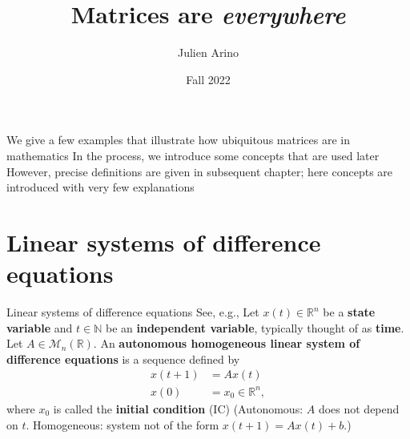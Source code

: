 \documentclass{beamer}
\title{Matrices are \emph{everywhere}}
\author{Julien Arino}
\date{Fall 2022}
\def\IN{\mathbb{N}}
\def\IR{\mathbb{R}}
\def\defword#1{\textbf{#1}}
\begin{document}
\begin{frame}[plain]
    \maketitle
\end{frame}

\begin{frame}
We give a few examples that illustrate how ubiquitous matrices are in mathematics
\vfill
In the process, we introduce some concepts that are used later
\vfill
However, precise definitions are given in subsequent chapter; here concepts are introduced with very few explanations
\end{frame}



\section{Linear systems of difference equations}
\label{sec:linear_DE}
\begin{frame}{Linear systems of difference equations}
	See, e.g., \cite{Elaydi2005}
	\vfill
Let $x(t)\in \IR^n$ be a \defword{state variable} and $t\in \IN$ be an \defword{independent variable}, typically thought of as \defword{time}. Let $A\in \mathcal{M}_n(\IR)$. 
An \defword{autonomous homogeneous linear system of difference equations} is a sequence defined by
\begin{subequations}\label{sys:DE}
\begin{align}
x(t+1) &= Ax(t) \label{sys:DE_dx}\\
x(0) &=x_0\in \IR^n, \label{sys:DE_IC}
\end{align}	
\end{subequations}
where $x_0$ is called the \defword{initial condition} (IC)
\vfill
(Autonomous: $A$ does not depend on $t$. Homogeneous: system not of the form $x(t+1)=Ax(t)+b$.)
\end{frame}
\end{document}
